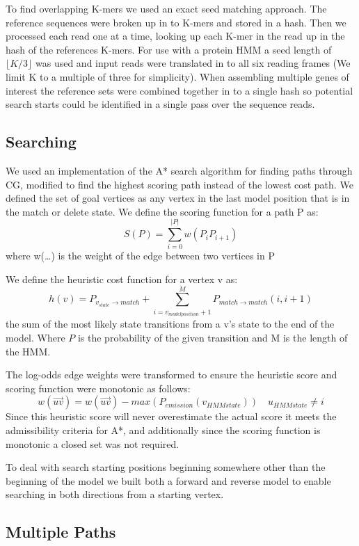 \documentclass{article}
\begin{document}
To find overlapping K-mers we used an exact seed matching approach. The reference sequences were broken up in to K-mers and stored in a hash. Then we processed each read one at a time, looking up each K-mer in the read up in the hash of the references K-mers.  For use with a protein HMM a seed length of $\lfloor K/3\rfloor$ was used and input reads were translated in to all six reading frames (We limit K to a multiple of three for simplicity). When assembling multiple genes of interest the reference sets were combined together in to a single hash so potential search starts could be identified in a single pass over the sequence reads.

\subsection{Searching}
We used an implementation of the A* search algorithm\cite{Hart1968} for finding paths through CG, modified to find the highest scoring
path instead of the lowest cost path. We defined the set of goal vertices as any vertex in the last model position that is in the 
match or delete state.  We define the scoring function for a path P as: \[S(P) = \sum_{i=0}^{|P|}w(P_iP_{i+1})\] 
where w(\ldots) is the weight of the edge between two vertices in P

We define the heuristic cost function for a vertex v as:
\[h(v) = P_{v_{state}\rightarrow match} + \sum_{i=v_{model position} + 1}^{M}P_{match\rightarrow match}(i, i + 1)\]
the sum of the most likely state transitions from a v's state to the end of the model. Where $P$ is the probability of the given transition and M is the length of the HMM.

The log-odds edge weights were transformed to ensure the heuristic score and scoring function were monotonic as follows:
\[ w(\overrightarrow{uv}) = w(\overrightarrow{uv}) - max(P_{emission}(v_{HMM state})) \quad u_{HMM state} \ne i\]
Since this heuristic score will never overestimate the actual score it meets the admissibility criteria for A*, and additionally since the scoring function is monotonic a closed set was not required.

To deal with search starting positions beginning somewhere other than the beginning of the model we built both a forward and reverse model to enable searching in both directions from a starting vertex.

\subsection{Multiple Paths}
\end{document}
